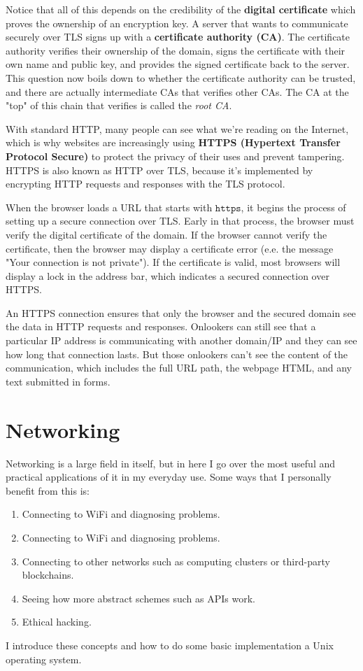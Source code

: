\documentclass{article}
\begin{document}
  Notice that all of this depends on the credibility of the \textbf{digital certificate} which proves the ownership of an encryption key. A server that wants to communicate securely over TLS signs up with a \textbf{certificate authority (CA)}. The certificate authority verifies their ownership of the domain, signs the certificate with their own name and public key, and provides the signed certificate back to the server. This question now boils down to whether the certificate authority can be trusted, and there are actually intermediate CAs that verifies other CAs. The CA at the "top" of this chain that verifies is called the \textit{root CA}. 

  With standard HTTP, many people can see what we're reading on the Internet, which is why websites are increasingly using \textbf{HTTPS (Hypertext Transfer Protocol Secure)} to protect the privacy of their uses and prevent tampering. HTTPS is also known as HTTP over TLS, because it's implemented by encrypting HTTP requests and responses with the TLS protocol. 

  When the browser loads a URL that starts with $\texttt{https}$, it begins the process of setting up a secure connection over TLS. Early in that process, the browser must verify the digital certificate of the domain. If the browser cannot verify the certificate, then the browser may display a certificate error (e.e. the message "Your connection is not private"). If the certificate is valid, most browsers will display a lock in the address bar, which indicates a secured connection over HTTPS. 

  An HTTPS connection ensures that only the browser and the secured domain see the data in HTTP requests and responses. Onlookers can still see that a particular IP address is communicating with another domain/IP and they can see how long that connection lasts. But those onlookers can't see the content of the communication, which includes the full URL path, the webpage HTML, and any text submitted in forms. 

\section{Networking} 

  Networking is a large field in itself, but in here I go over the most useful and practical applications of it in my everyday use. Some ways that I personally benefit from this is:

  \begin{enumerate}
    \item Connecting to WiFi and diagnosing problems.  
    \item Connecting to WiFi and diagnosing problems. 
    \item Connecting to other networks such as computing clusters or third-party blockchains.  
    \item Seeing how more abstract schemes such as APIs work. 
    \item Ethical hacking. 
  \end{enumerate}
  I introduce these concepts and how to do some basic implementation a Unix operating system.
\end{document}

